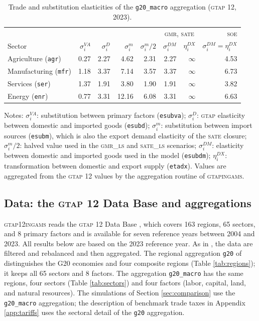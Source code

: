 \documentclass{jgea}
\newcommand{\SOE}{\textsc{soe}\xspace}
\newcommand{\SATE}{\textsc{sate}\xspace}
\newcommand{\GMR}{\textsc{gmr}\xspace}
\newcommand{\GMRLS}{\textsc{gmr\_ls}\xspace}
\newcommand{\SATELS}{\textsc{sate\_ls}\xspace}
\newcommand{\GTAP}{\textsc{gtap}\xspace}
\newcommand{\GTAPINGAMS}{\textsc{gtapingams}\xspace}
\newcommand{\GTAPtwelve}{\textsc{gtap12ingams}\xspace}
\begin{document}
\begin{table}[t!]
\begin{center}
\caption{Trade and substitution elasticities of the \texttt{g20\_macro} aggregation (\GTAP 12, 2023).}\label{tab:elasticities}
\small
\begin{tabular}{lrrrrrrr}
\toprule
 & & & & & \multicolumn{2}{c}{\GMR, \SATE} & \SOE \\
Sector & $\sigma^{VA}_i$ & $\sigma^D_i$ & $\sigma^m_i$ & $\sigma^m_i/2$ & $\sigma^{DM}_i$ & $\eta^{DX}_i$ & $\sigma^{DM}_i=\eta^{DX}_i$ \\
\midrule
Agriculture (\texttt{agr})   & 0.27 & 2.27 & 4.62 & 2.31 & 2.27 & $\infty$ & 4.53 \\
Manufacturing (\texttt{mfr}) & 1.18 & 3.37 & 7.14 & 3.57 & 3.37 & $\infty$ & 6.73 \\
Services (\texttt{ser})      & 1.37 & 1.91 & 3.80 & 1.90 & 1.91 & $\infty$ & 3.82 \\
Energy (\texttt{enr})        & 0.77 & 3.31 & 12.16 & 6.08 & 3.31 & $\infty$ & 6.63 \\
\bottomrule
\end{tabular}
\end{center}
\footnotesize{Notes: $\sigma^{VA}_i$: substitution between primary
factors (\texttt{esubva}); $\sigma^D_i$: \GTAP elasticity between domestic and imported goods (\texttt{esubd}); $\sigma^m_i$: substitution between import sources (\texttt{esubm}), which is also the export demand elasticity of the \SATE closure; $\sigma^m_i/2$: halved value used in the \GMRLS and \SATELS scenarios; $\sigma^{DM}_i$: elasticity between domestic and imported goods used in the model (\texttt{esubdm}); $\eta^{DX}_i$: transformation between domestic and export supply (\texttt{etadx}).
Values are aggregated from the \GTAP 12 values by the aggregation routine of \GTAPINGAMS.}
\end{table}

\subsection{Data: the \GTAP 12 Data Base and aggregations}\label{sec:data}

\GTAPtwelve reads the \GTAP 12 Data Base \citep{Aguiar2025}, which covers 163 regions, 65 sectors, and 8 primary factors and is available for seven reference years between 2004 and 2023.
All results below are based on the 2023 reference year.
As in \citet{LanzRutherford2016}, the data are filtered and rebalanced and then aggregated.
The regional aggregation \texttt{g20} of \citet{LanzRutherford2016} distinguishes the G20 economies and four composite regions (Table \ref{tab:regions}); it keeps all 65 sectors and 8 factors.
The aggregation \texttt{g20\_macro} has the same regions, four sectors (Table \ref{tab:sectors}) and four factors (labor, capital, land, and natural resources).
The simulations of Section \ref{sec:comparison} use the \texttt{g20\_macro} aggregation; the description of benchmark trade taxes in Appendix \ref{app:tariffs} uses the sectoral detail of the \texttt{g20} aggregation.
\end{document}
